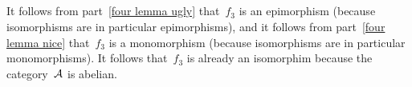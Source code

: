 \subsection{}

It follows from part~\ref{four lemma ugly} that~$f_3$ is an epimorphism (because isomorphisms are in particular epimorphisms), and it follows from part~\ref{four lemma nice} that~$f_3$ is a monomorphism (because isomorphisms are in particular monomorphisms).
It follows that~$f_3$ is already an isomorphim because the category~$\mathcal{A}$ is abelian.




